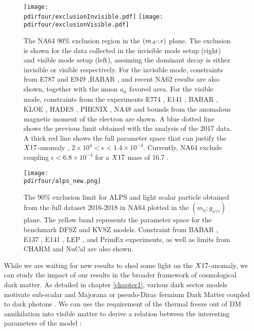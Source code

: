 \begin{figure}[tbh!]
  \centering
  \texttt{[image: \\pdirfour/exclusionInvisible.pdf]}
  \texttt{[image: \\pdirfour/exclusionVisible.pdf]}
  \caption[Exclusion limits in the $\dmplane$]{The NA64 90\% exclusion region in the $\dmplane$ plane. The exclusion is shown for the data collected in the invisible mode setup (right) and visible mode setup (left), assuming the dominant decay is either invisible or visible respectively\cite{NA64:2019imj,Banerjee:2019hmi}. For the invisible mode, constraints from E787 and E949 \cite{PhysRevD.89.095006,Essig:2013vha},BABAR \cite{PhysRevLett.119.131804}, and recent NA62 results \cite{CortinaGil:2019nuo} are also shown, together with the muon $a_{\mu}$ favored area. For the visible mode, constraints from the experiments E774 \cite{PhysRevLett.67.2942}, E141 \cite{PhysRevLett.59.755}, BABAR \cite{babar1}, KLOE \cite{kloe2}, HADES \cite{hades}, PHENIX \cite{phenix}, NA48 \cite{na48} and bounds from the anomalous magnetic moment of the electron \cite{PhysRevD.89.095006} are shown. A blue dotted line shows the previous limit obtained with the analysis of the 2017 data. A thick red line shows the full parameter space that can justify the $X17$-anomaly \cite{PhysRevD.95.035017}, $2 \times 10^{4} < \epsilon< 1.4 \times 10^{-3}$. Currently, NA64 exclude coupling $\epsilon < 6.8 \times 10^{-4}$ for a $X17$ mass of 16.7 \mev.}
  \label{fig:exclusion-dmplane}
\end{figure}

\begin{figure}[bth!]
  \centering
  \texttt{[image: \\pdirfour/alps\_new.png]}
  \caption[Exclusion limits in the $(m_{a};g_{a \gamma \gamma})$ plane for ALPS and light scalar]{The 90\% exclusion limit for ALPS and light scalar particle obtained from the full dataset 2016-2018 in NA64 plotted in the $(m_{a};g_{a \gamma \gamma})$ plane. The yellow band represents the parameter space for the benchmark DFSZ \cite{DINE1981199} and KVSZ \cite{PhysRevLett.43.103} models. Constraint from BABAR \cite{Dolan:2017osp}, E137 \cite{e137}, E141 \cite{e141}, LEP , and PrimEx \cite{PhysRevLett.123.071801} experiments, as well as limits from CHARM \cite{BERGSMA1985458} and NuCal \cite{Dobrich:2019dxc} are also shown.}
  \label{fig:exclusion-dmplane-alps}
\end{figure}

While we are waiting for new results to shed some light on the $X17$-anomaly, we can study the impact of our results in the broader framework of cosmological dark matter. As detailed in chapter \ref{chapter1}, various dark sector models motivate sub-\gev scalar and Majorana or pseudo-Dirac fermium Dark Matter coupled to dark photons \cite{battaglieri2017cosmic}. We can use the requirement of the thermal freeze out of DM annihilation into visible matter to derive a relation between the interesting parameters of the model \cite{na64-prd}:

